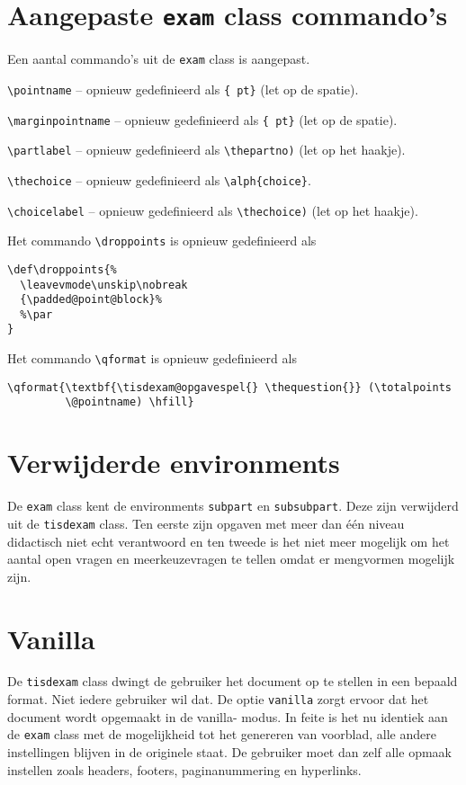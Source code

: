 \documentclass[12pt,dutch,addpoints,fleqn]{tisdexam}
\newcommand\Package[1]{\texttt{#1}}
\newcommand\DocClass[1]{\texttt{#1}}
\newcommand\Option[1]{\texttt{#1}}
\begin{document}
\section{Aangepaste \DocClass{exam} class commando's}
Een aantal commando's uit de \DocClass{exam} class is aangepast.

\verb|\pointname| -- opnieuw gedefinieerd als \verb|{ pt}| (let op de spatie).

\verb|\marginpointname| -- opnieuw gedefinieerd als \verb|{ pt}| (let op de spatie).

\verb|\partlabel| -- opnieuw gedefinieerd als \verb|\thepartno)| (let op het haakje).

\verb|\thechoice| -- opnieuw gedefinieerd als \verb|\alph{choice}|.

\verb|\choicelabel| -- opnieuw gedefinieerd als \verb|\thechoice)| (let op het haakje).

Het commando \verb|\droppoints| is opnieuw gedefinieerd als

\begin{lstlisting}
\def\droppoints{%
  \leavevmode\unskip\nobreak
  {\padded@point@block}%
  %\par
}
\end{lstlisting}

Het commando \verb|\qformat| is opnieuw gedefinieerd als

\begin{lstlisting}
\qformat{\textbf{\tisdexam@opgavespel{} \thequestion{}} (\totalpoints
         \@pointname) \hfill}
\end{lstlisting}


\section{Verwijderde environments}
De \DocClass{exam} class kent de environments \Package{subpart} en
\Package{subsubpart}. Deze zijn verwijderd uit de \DocClass{tisdexam} class.
Ten eerste zijn opgaven met meer dan \'{e}\'{e}n niveau didactisch niet
echt verantwoord en ten tweede is het niet meer mogelijk om het aantal
open vragen en meerkeuzevragen te tellen omdat er mengvormen mogelijk zijn.


\section{Vanilla}
\label{sec:vanilla}
De \DocClass{tisdexam} class dwingt de gebruiker het document op te stellen
in een bepaald format. Niet iedere gebruiker wil dat. De optie
\Option{vanilla} zorgt ervoor dat het document wordt opgemaakt in de vanilla-%
modus. In feite is het nu identiek aan de \DocClass{exam} class met de
mogelijkheid tot het genereren van voorblad, alle andere instellingen blijven
in de originele staat. De gebruiker moet dan zelf alle opmaak instellen
zoals headers, footers, paginanummering en hyperlinks.
\end{document}
